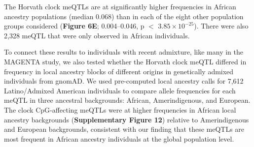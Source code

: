 The Horvath clock meQTLs are at significantly higher frequencies in African ancestry populations (median 0.068) than in each of the eight other population groups considered (\textbf{Figure 6E}; 0.004--0.046, p $<$ $3.85 \times 10^{-25}$). There were also 2,328 meQTL that were only observed in African individuals.

To connect these results to individuals with recent admixture, like many in the MAGENTA study, we also tested whether the Horvath clock meQTL differed in frequency in local ancestry blocks of different origins in genetically admixed individuals from gnomAD. We used pre-computed local ancestry calls for 7,612 Latino/Admixed American individuals to compare allele frequencies for each meQTL in three ancestral backgrounds: African, Amerindigenous, and European. The clock CpG-affecting meQTLs were at higher frequencies in African local ancestry backgrounds (\textbf{Supplementary Figure 12}) relative to Amerindigenous and European backgrounds, consistent with our finding that these meQTLs are most frequent in African ancestry individuals at the global population level.



